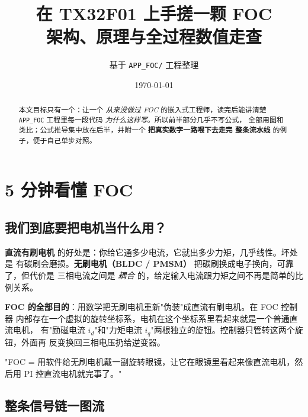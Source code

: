 \documentclass[UTF8,a4paper,11pt]{ctexart}
\title{在 TX32F01 上手搓一颗 FOC \\ \large 架构、原理与全过程数值走查}
\author{基于 \texttt{APP\_FOC/} 工程整理}
\date{\today}
\begin{document}
\maketitle

\begin{abstract}
本文目标只有一个：让一个 \emph{从来没做过 FOC} 的嵌入式工程师，读完后能讲清楚
\texttt{APP\_FOC} 工程里每一段代码 \emph{为什么这样写}。所以前半部分几乎不写公式，
全部用图和类比；公式推导集中放在后半，并附一个 \textbf{把真实数字一路喂下去走完
整条流水线} 的例子，便于自己单步对照。
\end{abstract}

\tableofcontents
\bigskip

\section{5 分钟看懂 FOC}

\subsection{我们到底要把电机当什么用？}

\textbf{直流有刷电机} 的好处是：你给它通多少电流，它就出多少力矩，几乎线性。坏处是
有碳刷会磨损。\textbf{无刷电机（BLDC / PMSM）} 把碳刷换成电子换向，可靠了，但代价是
三相电流之间是 \emph{耦合} 的，给定输入电流跟力矩之间不再是简单的比例关系。

\textbf{FOC 的全部目的}：用数学把无刷电机重新"伪装"成直流有刷电机。在 FOC 控制器
内部存在一个虚拟的旋转坐标系，电机在这个坐标系里看起来就是一个普通直流电机，
有"励磁电流 $i_d$"和"力矩电流 $i_q$"两根独立的旋钮。控制器只管转这两个旋钮，外面再
反变换回三相电压扔给逆变器。

\begin{intuition}
"FOC = 用软件给无刷电机戴一副旋转眼镜，让它在眼镜里看起来像直流电机，然后用 PI
控直流电机就完事了。"
\end{intuition}

\subsection{整条信号链一图流}
\end{document}

